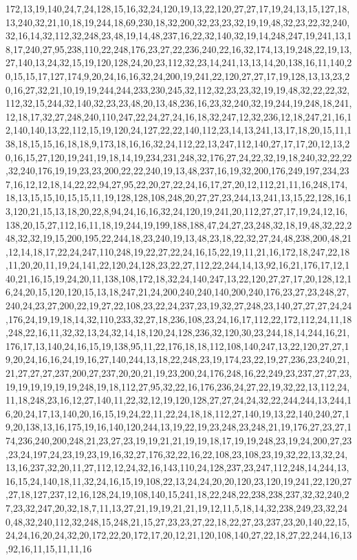 172,13,19,140,24,7,24,128,15,16,32,24,120,19,13,22,120,27,27,17,19,24,13,15,127,18,13,240,32,21,10,18,19,244,18,69,230,18,32,200,32,23,23,32,19,19,48,32,23,22,32,240,32,16,14,32,112,32,248,23,48,19,14,48,237,16,22,32,140,32,19,14,248,247,19,241,13,18,17,240,27,95,238,110,22,248,176,23,27,22,236,240,22,16,32,174,13,19,248,22,19,13,27,140,13,24,32,15,19,120,128,24,20,23,112,32,23,14,241,13,13,14,20,138,16,11,140,20,15,15,17,127,174,9,20,24,16,16,32,24,200,19,241,22,120,27,27,17,19,128,13,13,23,20,16,27,32,21,10,19,19,244,244,233,230,245,32,112,32,23,23,32,19,19,48,32,22,22,32,112,32,15,244,32,140,32,23,23,48,20,13,48,236,16,23,32,240,32,19,244,19,248,18,241,12,18,17,32,27,248,240,110,247,22,24,27,24,16,18,32,247,12,32,236,12,18,247,21,16,12,140,140,13,22,112,15,19,120,24,127,22,22,140,112,23,14,13,241,13,17,18,20,15,11,138,18,15,15,16,18,18,9,173,18,16,16,32,24,112,22,13,247,112,140,27,17,17,20,12,13,20,16,15,27,120,19,241,19,18,14,19,234,231,248,32,176,27,24,22,32,19,18,240,32,22,22,32,240,176,19,19,23,23,200,22,22,240,19,13,48,237,16,19,32,200,176,249,197,234,237,16,12,12,18,14,22,22,94,27,95,22,20,27,22,24,16,17,27,20,12,112,21,11,16,248,174,18,13,15,15,10,15,15,11,19,128,128,108,248,20,27,27,23,244,13,241,13,15,22,128,16,13,120,21,15,13,18,20,22,8,94,24,16,16,32,24,120,19,241,20,112,27,27,17,19,24,12,16,138,20,15,27,112,16,11,18,19,244,19,199,188,188,47,24,27,23,248,32,18,19,48,32,22,248,32,32,19,15,200,195,22,244,18,23,240,19,13,48,23,18,22,32,27,24,48,238,200,48,21,12,14,18,17,22,24,247,110,248,19,22,27,22,24,16,15,22,19,11,21,16,172,18,247,22,18,11,20,20,11,19,24,141,22,120,24,128,23,22,27,112,22,244,14,13,92,16,21,176,17,12,140,21,16,15,19,24,20,11,138,108,172,18,32,24,140,247,13,22,120,27,27,17,20,128,12,16,24,20,15,120,120,15,13,18,247,21,24,200,240,240,140,200,240,176,23,27,23,248,27,240,24,23,27,200,22,19,27,22,108,23,22,24,237,23,19,32,27,248,23,140,27,27,27,24,24,176,24,19,19,18,14,32,110,233,32,27,18,236,108,23,24,16,17,112,22,172,112,24,11,18,248,22,16,11,32,32,13,24,32,14,18,120,24,128,236,32,120,30,23,244,18,14,244,16,21,176,17,13,140,24,16,15,19,138,95,11,22,176,18,18,112,108,140,247,13,22,120,27,27,19,20,24,16,16,24,19,16,27,140,244,13,18,22,248,23,19,174,23,22,19,27,236,23,240,21,21,27,27,27,237,200,27,237,20,20,21,19,23,200,24,176,248,16,22,249,23,237,27,27,23,19,19,19,19,19,19,248,19,18,112,27,95,32,22,16,176,236,24,27,22,19,32,22,13,112,24,11,18,248,23,16,12,27,140,11,22,32,12,19,120,128,27,27,24,24,32,22,244,244,13,244,16,20,24,17,13,140,20,16,15,19,24,22,11,22,24,18,18,112,27,140,19,13,22,140,240,27,19,20,138,13,16,175,19,16,140,120,244,13,19,22,19,23,248,23,248,21,19,176,27,23,27,174,236,240,200,248,21,23,27,23,19,19,21,21,19,19,18,17,19,19,248,23,19,24,200,27,23,23,24,197,24,23,19,23,19,16,32,27,176,32,22,16,22,108,23,108,23,19,32,22,13,32,24,13,16,237,32,20,11,27,112,12,24,32,16,143,110,24,128,237,23,247,112,248,14,244,13,16,15,24,140,18,11,32,24,16,15,19,108,22,13,24,24,20,20,120,23,120,19,241,22,120,27,27,18,127,237,12,16,128,24,19,108,140,15,241,18,22,248,22,238,238,237,32,32,240,27,23,32,247,20,32,18,7,11,13,27,21,19,19,21,21,19,12,11,5,18,14,32,238,249,23,32,240,48,32,240,112,32,248,15,248,21,15,27,23,23,27,22,18,22,27,23,237,23,20,140,22,15,24,24,16,20,24,32,20,172,22,20,172,17,20,12,21,120,108,140,27,22,18,27,22,244,16,13,92,16,11,15,11,11,16